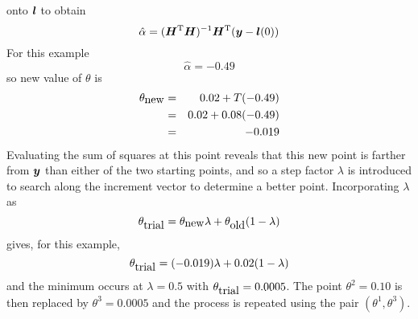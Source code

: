 \begin{example}
onto ${\boldsymbol l}$ to obtain
\begin{displaymath}
  \hat{\alpha}=( \bH \trans \bH )^{-1}
  \bH \trans ( \by - \bl ( 0 ) )
\end{displaymath}
For this example
\begin{displaymath}
  \hat{\alpha}=-0.49
\end{displaymath}
so new value of $\theta$ is
\begin{eqnarray*}
  \theta_{\mbox{\rm new}}&=&0.02+T ( - 0.49 )\\
  &=&0.02 + 0.08 ( -0.49 )\\
  &=&-0.019
\end{eqnarray*}
Evaluating the sum of squares at this point reveals that this new
point is farther from ${\boldsymbol y}$ than either of the two starting
points, and so a step factor $\lambda$ is introduced to
search along the increment vector to determine a better point.
Incorporating $\lambda$ as
  \begin{displaymath}
    \theta_{\mbox{\rm trial}} = \theta_{\mbox{\rm new}} \lambda +
    \theta_{\mbox{\rm old}} ( 1 - \lambda )
  \end{displaymath}
gives, for this example,
  \begin{displaymath}
    \theta_{\mbox{\rm trial}} = (- 0.019) \lambda + 0.02 ( 1 - \lambda )
  \end{displaymath}
and the minimum occurs at $\lambda = 0.5$ with
$\theta_{\mbox{\rm trial}} = 0.0005$.
The point $\theta^2=0.10$ is then replaced by $\theta^3=0.0005$
and the process is repeated using the pair
$( \theta^1 , \theta^3 )$.
\end{example}

